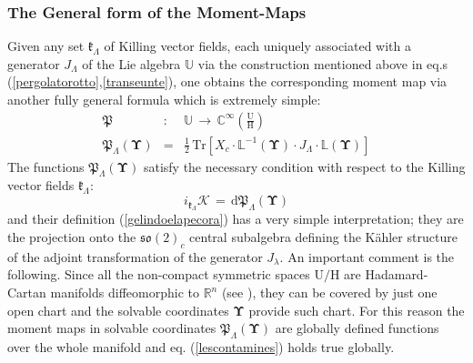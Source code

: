 \documentclass[10pt,a4paper]{article}
\newcommand{\ft}[2]{{\textstyle\frac{#1}{#2}}}
\newcommand{\so}{\mathfrak{so}}
\begin{document}
\subsubsection{The General form of the Moment-Maps}
\label{deagostini}
Given any set $\boldsymbol{\mathfrak{k}}_\Lambda$ of Killing vector fields, each uniquely associated with a generator $J_\Lambda$ of the Lie algebra $\mathbb{U}$ via the construction mentioned above in eq.s
(\ref{pergolatorotto},\ref{transeunte}), one obtains the corresponding moment map via another fully general formula
which is extremely simple:
\begin{eqnarray}\label{gelindoelapecora}
  \mathfrak{P} & : & \mathbb{U} \, \longrightarrow \, \mathbb{C}^{\infty}\left(\frac{\mathrm{U}}{\mathrm{H}}\right)\nonumber\\
  \mathfrak{P}_\Lambda\left(\boldsymbol{\Upsilon}\right) &=& \ft 12 \, \text{Tr} \left[ X_c\cdot \mathbb{L}^{-1}
  \left(\boldsymbol{\Upsilon}\right)\cdot J_\Lambda \cdot \mathbb{L}
  \left(\boldsymbol{\Upsilon}\right)\right]
\end{eqnarray}
The functions $\mathfrak{P}_\Lambda\left(\boldsymbol{\Upsilon}\right)$  satisfy the necessary condition with respect to the Killing vector fields $\boldsymbol{\mathfrak{k}}_\Lambda$:
\begin{equation}\label{lescontamines}
  i_{\boldsymbol{\mathfrak{k}}_\Lambda}\boldsymbol{\mathcal{K}}  \, = \, \mathrm{d}\mathfrak{P}_\Lambda\left(\boldsymbol{\Upsilon}\right)
\end{equation}
and their definition (\ref{gelindoelapecora}) has a very simple interpretation; they are the projection onto the $\so(2)_c$ central subalgebra defining the K\"ahler structure of the adjoint transformation of the generator $J_\lambda$. An important comment is the following. Since all the non-compact symmetric spaces $\mathrm{U/H}$ are
Hadamard-Cartan manifolds diffeomorphic to $\mathbb{R}^n$ (see \cite{TSnaviga}), they can be covered by just one open chart and the solvable coordinates $\boldsymbol{\Upsilon}$ provide such chart. For this reason the moment maps in solvable coordinates $\mathfrak{P}_\Lambda\left(\boldsymbol{\Upsilon}\right)$ are globally defined functions over the whole manifold and eq. (\ref{lescontamines}) holds true globally.
\end{document}
